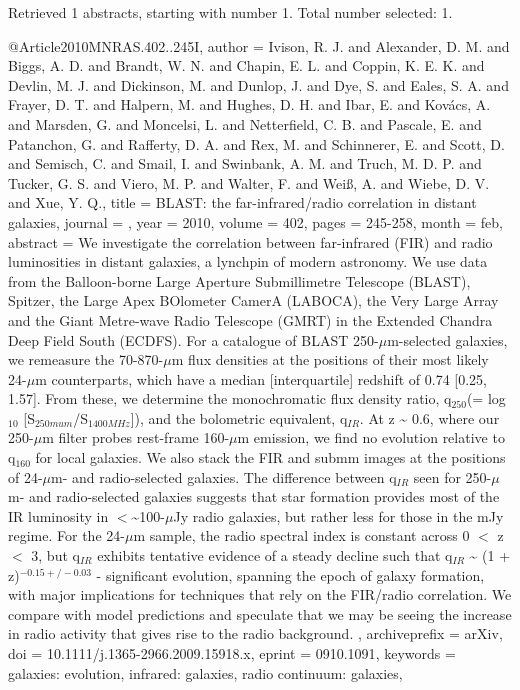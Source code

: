 \documentclass[longauth]{aa}
\begin{document}
{{{{{{{Retrieved 1 abstracts, starting with number 1.  Total number selected: 1.

@Article{2010MNRAS.402..245I,
  author        = {Ivison, R. J. and Alexander, D. M. and Biggs, A. D. and Brandt, W. N. and Chapin, E. L. and Coppin, K. E. K. and Devlin, M. J. and Dickinson, M. and Dunlop, J. and Dye, S. and Eales, S. A. and Frayer, D. T. and Halpern, M. and Hughes, D. H. and Ibar, E. and Kov{\'a}cs, A. and Marsden, G. and Moncelsi, L. and Netterfield, C. B. and Pascale, E. and Patanchon, G. and Rafferty, D. A. and Rex, M. and Schinnerer, E. and Scott, D. and Semisch, C. and Smail, I. and Swinbank, A. M. and Truch, M. D. P. and Tucker, G. S. and Viero, M. P. and Walter, F. and Wei{\ss}, A. and Wiebe, D. V. and Xue, Y. Q.},
  title         = {BLAST: the far-infrared/radio correlation in distant galaxies},
  journal       = {\mnras},
  year          = {2010},
  volume        = {402},
  pages         = {245-258},
  month         = feb,
  abstract      = {We investigate the correlation between far-infrared (FIR) and radio
luminosities in distant galaxies, a lynchpin of modern astronomy. We use
data from the Balloon-borne Large Aperture Submillimetre Telescope
(BLAST), Spitzer, the Large Apex BOlometer CamerA (LABOCA), the Very
Large Array and the Giant Metre-wave Radio Telescope (GMRT) in the
Extended Chandra Deep Field South (ECDFS). For a catalogue of BLAST
250-{$\mu$}m-selected galaxies, we remeasure the 70-870-{$\mu$}m flux
densities at the positions of their most likely 24-{$\mu$}m counterparts,
which have a median [interquartile] redshift of 0.74 [0.25, 1.57]. From
these, we determine the monochromatic flux density ratio,
q$_{250}$(= log$_{10}$
[S$_{250mum}$/S$_{1400MHz}$]), and the bolometric
equivalent, q$_{IR}$. At z \~{} 0.6, where our 250-{$\mu$}m filter
probes rest-frame 160-{$\mu$}m emission, we find no evolution relative to
q$_{160}$ for local galaxies. We also stack the FIR and submm
images at the positions of 24-{$\mu$}m- and radio-selected galaxies. The
difference between q$_{IR}$ seen for 250-{$\mu$}m- and radio-selected
galaxies suggests that star formation provides most of the IR luminosity
in $\lt$\~{}100-{$\mu$}Jy radio galaxies, but rather less for those in the mJy
regime. For the 24-{$\mu$}m sample, the radio spectral index is constant
across 0 $\lt$ z $\lt$ 3, but q$_{IR}$ exhibits tentative evidence
of a steady decline such that q$_{IR}$ \~{} (1 +
z)$^{-0.15+/-0.03}$ - significant evolution, spanning the epoch of
galaxy formation, with major implications for techniques that rely on
the FIR/radio correlation. We compare with model predictions and
speculate that we may be seeing the increase in radio activity that
gives rise to the radio background.
},
  archiveprefix = {arXiv},
  doi           = {10.1111/j.1365-2966.2009.15918.x},
  eprint        = {0910.1091},
  keywords      = {galaxies: evolution, infrared: galaxies, radio continuum: galaxies},
}

}}}}}}}
\end{document}

